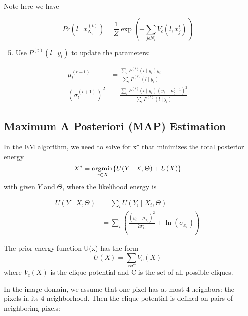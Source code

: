 Note here we have

\begin{equation}
Pr(l \mid x^{(t)}_{N_i})=\frac{1}{Z}\exp(-{\sum\limits_{j \epsilon N_i}}V_c(l,x^t_j))
\end{equation}

\begin{enumerate}
	\setcounter{enumi}{4}
	\item Use \(P^{(t)}(l \mid y_i)\) to update the parameters: 
\end{enumerate}

\begin{equation}
\begin{split}
\mu^{(t+1)}_l & = \frac{{\sum\limits_{i}}P^{(t)}(l \mid y_i)y_i}{{\sum\limits_{i}}P^{(t)}(l \mid y_i)} \\
(\sigma^{(t+1)}_l)^2 & =\frac{{\sum\limits_{i}}P^{(t)}(l \mid y_i)(y_i-\mu^{t+1}_l)^2}{{\sum\limits_{i}}P^{(t)}(l \mid y_i)}
\end{split}
\end{equation}

\subsection{Maximum A Posteriori (MAP) Estimation}
In the EM algorithm, we need to solve for x? that minimizes
the total posterior energy
\begin{equation}\label{eq:MAp}
X^* = \operatorname*{argmin}_{x \in X} \{U( Y \mid X, \Theta) + U(X)\}
\end{equation}
with given $Y$ and $\Theta$, where the likelihood energy is

\begin{equation}
\begin{split}
U( Y \mid X, \Theta) & ={\sum\limits_{i}}U( Y_i \mid X_i, \Theta)\\
& = {\sum\limits_{i}}(\frac{(y_i-\mu_{x_i})^2}{2\sigma_{x_i}^2} + \ln(\sigma_{x_i}))
\end{split}
\end{equation}

The prior energy function U(x) has the form
\begin{equation}
U(X) = {\sum\limits_{c \epsilon C}}V_c(X)
\end{equation}
where $V_c(X)$ is the clique potential and C is the set of all
possible cliques.

In the image domain, we assume that one pixel has at most 4 neighbors: the pixels in its 4-neighborhood. Then the clique potential is defined on pairs of neighboring pixels:

